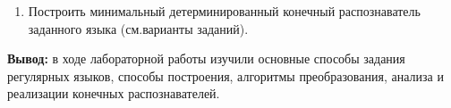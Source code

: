 \documentclass[a4paper,14pt]{extarticle}
\begin{document}
\begin{enumerate}[1.]
    \item Построить минимальный детерминированный конечный распознаватель 
    заданного языка (см.варианты заданий).\\
\end{enumerate}

\textbf{Вывод: } в ходе лабораторной работы изучили основные способы задания регулярных языков, 
способы построения, алгоритмы преобразования, анализа и реализации конечных 
распознавателей.
\end{document}
